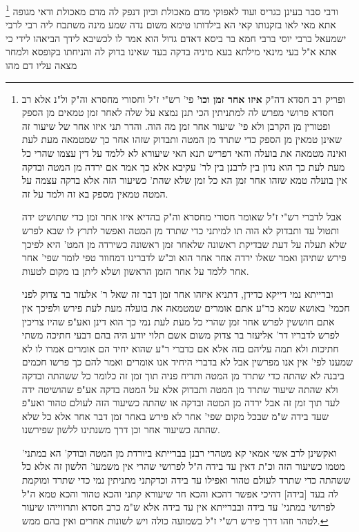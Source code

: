 \documentclass[12pt, openany]{book}
\newcommand{\footnotecomment}[1]{
	\renewcommand\thefootnote{}
	\footnote{#1}}
\newcommand{\commenta}[1]{\footnotecomment{#1}}
\begin{document}
{\commenta{ ופריק רב חסדא דה"ק \textbf{איזו אחר זמן וכו'} פי' רש"י ז"ל וחסורי מחסרא וה"ק ול"נ אלא רב חסדא פרושי מפרש לה למתניתין הכי תנן נמצא על שלה לאחר זמן טמאים מן הספק ופטורין מן הקרבן ולא פי' שיעור אחר זמן מה הוה. והדר תני איזו אחר של שיעור זה שאינן טמאין מן הספק כדי שתרד מן המטה ותבדוק שזהו אחר כך שמטמאה מעת לעת ואינה מטמאה את בועלה והאי דפריש תנא האי שיעורא לא ללמד על דין עצמו שהרי כל מעת לעת כך הוא נדון בין לרבנן בין לר' עקיבא אלא כך אמר אם ירדה מן המטה ובדקה אין בועלה טמא שזהו אחר זמן הא כל זמן שלא שהת' כשיעור הזה אלא בדקה עצמה על המטה טמאין מספק בא זה ולמד על זה.\par אבל לדברי רש"י ז"ל שאומר חסורי מחסרא וה"ק בהדיא איזו אחר זמן כדי שתושיט ידה ותטול עד ותבדוק לא הוה תו למיתני כדי שתרד מן המטה ואפשר לתרץ לו שבא לפרש שלא תעלה על דעת שבדיקת ראשונה שלאחר זמן ראשונה כשירדה מן המט' היא לפיכך פירש שתיהן ואמר שאלו ירדה אחר אחר הוא וכ"ש לדברינו דמחוור טפי לומר שפי' אחר אחר ללמד על אחר הזמן הראשון ושלא ליתן בו מקום לטעות.\par וברייתא נמי דייקא כדידן, דתניא איזהו אחר זמן דבר זה שאל ר' אלעזר בר צדוק לפני חכמי' באושא שמא כר"ע אתם אומרים שמטמאה את בועלה מעת לעת פירש ולפיכך אין אתם חוששין לפרש אחר זמן שהרי כל מעת לעת נמי כך הוא דינן ואע"פ שהיו צריכין לפרש לדבריו דר' אליעזר בר צדוק משום אשם תלוי יודע היה בהם דבעי חתיכה משתי חתיכות ולא תמה עליהם בזה אלא אם כדברי ר"ע שהוא יחיד הם אומרים אמרו לו לא שמענו לפי' אין אנו מפרשין אבל לא בדברי היחיד אנו אומרים ואמר להם כך פרשו חכמים ביבנה לא שהתה כדי שתרד מן המטה ותדיח פניה תוך זמן זה כלומר כל ששהתה ובדקה ולא שהתה שיעור שתרד מן המטה ותבדוק אלא על המטה בדקה אע"פ שהושיטה ידה לעד תוך זמן זה אבל ירדה מן המטה ובדקה או שהתה כשיעור הזה לעולם טהור ואע"פ שעד בידה ש"מ שבכל מקום שפי' אחר לא פירש באחר זמן דבר אחר אלא כל שלא שהתה כשיעור אחר וכן דרך משנתינו ללשון שפירשנו.\par ואקשינן לרב אשי אמאי קא מטהרי רבנן בברייתא ביורדת מן המטה ובודק' הא במתני' מטמו כשיעור הזה וכ"ת דאין עד בידה ה"ל לפרושי שהרי אין משמעו' הלשון זה אלא כל ששהתה כדי שתרד לעולם טהור ואפילו עד בידה וכדקתני מתניתין נמי כדי שתרד ומוקמת לה בעד [בידה] דהיכי אפשר דהכא והכא חד שיעורא קתני והכא טהור והכא טמא ה"ל לפרושי במתני' עד בידה ובברייתא אין עד בידה אלא ש"מ כרב חסדא ותרווייהו שיעור לטהר וזהו דרך פירש רש"י ז"ל בשמועה כולה ויש לשונות אחרים ואין בהם ממש. }
ורבי סבר בעינן כגריס ועוד לאפוקי מדם מאכולת וכיון דנפק לה מדם מאכולת ודאי מגופה אתא 
מאי לאו בזקנותו קאי הא בילדותו טימא משום נדה שמע מינה 
משתבח ליה רבי לרבי ישמעאל ברבי יוסי ברבי חמא בר ביסא דאדם גדול הוא אמר לו לכשיבא לידך הביאהו לידי 
כי אתא א"ל בעי מינאי מילתא בעא מיניה בדקה בעד שאינו בדוק לה והניחתו בקופסא ולמחר מצאה עליו דם מהו 
}
\end{document}

